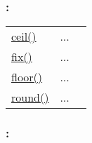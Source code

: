 \subsubsection*{: }

\textcolor{blue}{}\begin{tabular}{>{\raggedleft}p{3cm}>{\centering}p{0.5cm}l}
\textcolor{blue}{\hyperlink{ceil}{ceil()}}&
...&
 \begin{NoHyper} \nameref{par:ceil} \end{NoHyper}\tabularnewline
\textcolor{blue}{\hyperlink{fix}{fix()}}&
...&
 \begin{NoHyper} \nameref{par:fix} \end{NoHyper}\tabularnewline
\textcolor{blue}{\hyperlink{floor}{floor()}}&
...&
 \begin{NoHyper} \nameref{par:floor} \end{NoHyper}\tabularnewline
\textcolor{blue}{\hyperlink{round}{round()}}&
...&
 \begin{NoHyper} \nameref{par:round} \end{NoHyper}\tabularnewline
\end{tabular}


\subsubsection*{: }

